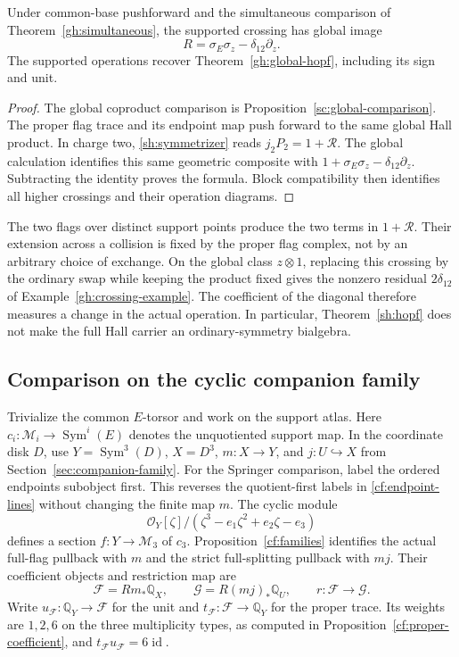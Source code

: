 \begin{corollary}\label{sh:global-crossing}
Under common-base pushforward and the simultaneous comparison
of Theorem~\ref{gh:simultaneous}, the supported crossing has
global image
\[
 R=\sigma_E\sigma_z-\delta_{12}\partial_z.
\]
The supported operations recover
Theorem~\ref{gh:global-hopf}, including its sign and unit.
\end{corollary}
\begin{proof}
The global coproduct comparison is
Proposition~\ref{sc:global-comparison}. The proper flag trace
and its endpoint map push forward to the same global Hall
product. In charge two, \eqref{sh:symmetrizer} reads
$j_2P_2=1+\mathcal R$. The global calculation identifies this
same geometric composite with
$1+\sigma_E\sigma_z-\delta_{12}\partial_z$.
Subtracting the identity proves the formula. Block compatibility
then identifies all higher crossings and their operation
diagrams.
\end{proof}

\begin{example}\label{sh:binary-example}
The two flags over distinct support points produce the two
terms in $1+\mathcal R$. Their extension across a collision is
fixed by the proper flag complex, not by an arbitrary choice of
exchange. On the global class $z\otimes1$, replacing this
crossing by the ordinary swap while keeping the product fixed
gives the nonzero residual $2\delta_{12}$ of
Example~\ref{gh:crossing-example}. The coefficient of the
diagonal therefore measures a change in the actual operation.
In particular, Theorem~\ref{sh:hopf} does not make the full Hall
carrier an ordinary-symmetry bialgebra.
\end{example}

\subsection{Comparison on the cyclic companion family}

Trivialize the common $E$-torsor and work on the support atlas.
Here $c_i:\mathcal M_i\to\operatorname{Sym}^i(E)$ denotes
the unquotiented support map. In the coordinate disk $D$, use
$Y=\operatorname{Sym}^3(D)$, $X=D^3$, $m:X\to Y$, and
$j:U\hookrightarrow X$ from Section~\ref{sec:companion-family}.
For the Springer comparison, label the ordered endpoints
subobject first. This reverses the quotient-first labels in
\eqref{cf:endpoint-lines} without changing the finite map $m$.
The cyclic module
\[
 \mathcal O_Y[\zeta]/
       (\zeta^3-e_1\zeta^2+e_2\zeta-e_3)
\]
defines a section $f:Y\to\mathcal M_3$ of $c_3$.
Proposition~\ref{cf:families} identifies the actual full-flag
pullback with $m$ and the strict full-splitting pullback with
$mj$. Their coefficient objects and restriction map are
\[
 \mathcal F=Rm_*\mathbb Q_X,
 \qquad \mathcal G=R(mj)_*\mathbb Q_U,
 \qquad r:\mathcal F\longrightarrow\mathcal G.
\]
Write $u_{\mathcal F}:\mathbb Q_Y\to\mathcal F$ for the unit
and $t_{\mathcal F}:\mathcal F\to\mathbb Q_Y$ for the proper
trace. Its weights are $1,2,6$ on the three multiplicity types,
as computed in Proposition~\ref{cf:proper-coefficient}, and
$t_{\mathcal F}u_{\mathcal F}=6\operatorname{id}$.

